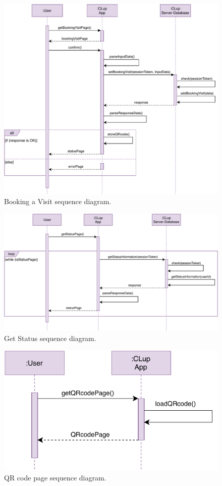 \begin{figure}[H]
	\centering
	\includegraphics[width=1.0\textwidth]{images/bookingVisit_sequence_diagram.pdf}
	\caption{Booking a Visit sequence diagram.}
\end{figure}

\begin{figure}[H]
	\centering
	\includegraphics[width=1.0\textwidth]{images/getStatusPage_sequence_diagram.pdf}
	\caption{Get Status sequence diagram.}
\end{figure}

\begin{figure}[H]
	\centering
	\includegraphics[width=1.0\textwidth]{images/getQRcodePage_sequence_diagram.pdf}
	\caption{QR code page sequence diagram.}
\end{figure}

